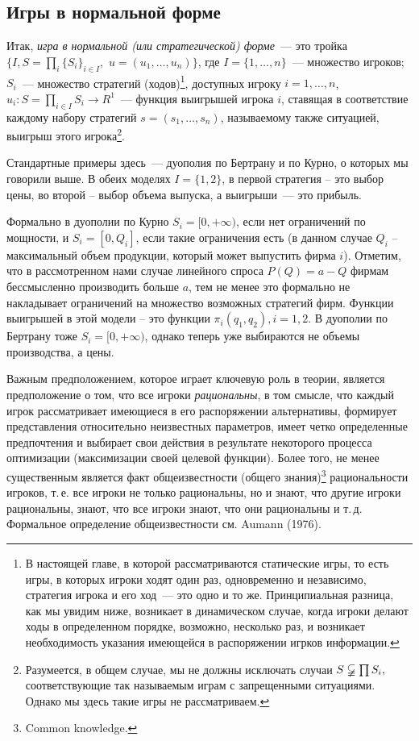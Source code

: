\documentclass[12pt]{article}
\begin{document}
\subsection{Игры в нормальной форме}

Итак, {\it игра в нормальной (или стратегической) форме}~--- это тройка
$\{I,S=\prod_i\{S_i\}_{i\in I},\,\,u=(u_1,\ldots,u_n)\}$, где
$I=\{1,\ldots,n\}$~--- множество игроков; $S_i$~--- множество
стратегий (ходов)\footnote{В настоящей главе, в которой
рассматриваются статические игры, то есть игры, в которых игроки
ходят один раз, одновременно и независимо, стратегия игрока и его
ход~--- это одно  и то же. Принципиальная разница, как мы увидим
ниже, возникает в динамическом случае, когда игроки делают ходы
в определенном порядке, возможно, несколько раз, и возникает необходимость
указания имеющейся в распоряжении игрков информации.}, доступных игроку
$i=1,\ldots,n$, $u_i:S=\prod_{i\in I} S_i\to R^1$~--- функция
выигрышей игрока $i$, ставящая в соответствие каждому набору
стратегий $s=(s_1,\ldots,s_n)$, называемому также ситуацией, выигрыш
этого игрока\footnote{ Разумеется, в общем случае, мы не должны
исключать случаи $S\varsubsetneqq\prod S_i,$ соответствующие
так называемым играм с запрещенными ситуациями.  Однако мы здесь
такие игры не рассматриваем.}.

Стандартные примеры здесь~--- дуополия по Бертрану и по Курно, о
которых мы говорили выше. В обеих моделях $I=\{1,2\}$,
в первой стратегия -- это выбор цены, во второй -- выбор объема выпуска,
а выигрыши~--- это прибыль.

Формально в дуополии по Курно $S_i=[0,+\infty)$, если нет
ограничений по мощности, и $S_i=[0,Q_i]$, если такие ограничения
есть (в данном случае $Q_i$ -- максимальный объем продукции,
который может выпустить фирма $i$). Отметим, что в рассмотренном
нами случае линейного спроса $P(Q)=a-Q$ фирмам бессмысленно
производить больше $a$, тем не менее это формально не
накладывает ограничений на множество возможных стратегий фирм. Функции
выигрышей в этой модели -- это функции $\pi_i(q_1,q_2), i=1,2$. В
дуополии по Бертрану тоже $S_i=[0,+\infty)$, однако теперь уже
выбираются не объемы производства, а цены.

Важным предположением, которое играет ключевую роль в теории,
является предположение о том, что все игроки {\it {рациональны}}, в
том смысле, что каждый игрок рассматривает имеющиеся в его
распоряжении альтернативы, формирует представления относительно
неизвестных параметров, имеет четко определенные предпочтения и
выбирает свои действия в результате некоторого процесса оптимизации
(максимизации своей целевой функции).  Более того, не менее
существенным является факт общеизвестности (общего знания)\footnote{
Common knowledge.} рациональности игроков, т.\,е. все игроки не
только рациональны, но и знают, что другие игроки рациональны,
знают, что все игроки знают,  что они рациональны и т.\,д.
Формальное определение общеизвестности см. Aumann (1976).
\end{document}
